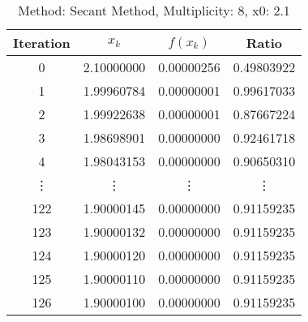 \begin{table}
\centering
\caption{Method: Secant Method, Multiplicity: 8, x0: 2.1}
\label{tab:table_Secant_Method_8_2_1}
\begin{tabular}{c c c c}
\toprule
Iteration &      $x_k$ &   $f(x_k)$ &      Ratio \\
\midrule
        0 & 2.10000000 & 0.00000256 & 0.49803922 \\
        1 & 1.99960784 & 0.00000001 & 0.99617033 \\
        2 & 1.99922638 & 0.00000001 & 0.87667224 \\
        3 & 1.98698901 & 0.00000000 & 0.92461718 \\
        4 & 1.98043153 & 0.00000000 & 0.90650310 \\
   \vdots &     \vdots &     \vdots &     \vdots \\
      122 & 1.90000145 & 0.00000000 & 0.91159235 \\
      123 & 1.90000132 & 0.00000000 & 0.91159235 \\
      124 & 1.90000120 & 0.00000000 & 0.91159235 \\
      125 & 1.90000110 & 0.00000000 & 0.91159235 \\
      126 & 1.90000100 & 0.00000000 & 0.91159235 \\
\bottomrule
\end{tabular}
\end{table}
